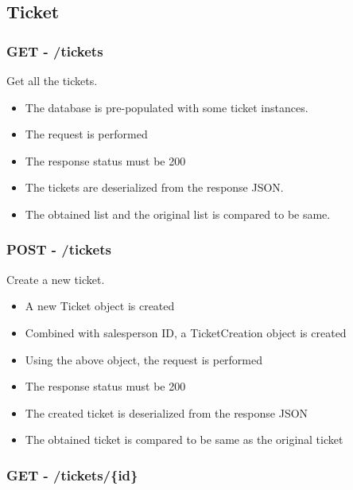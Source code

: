 \documentclass[]{article}
\providecommand{\tightlist}{%
  \setlength{\itemsep}{0pt}\setlength{\parskip}{0pt}}
\begin{document}
\hypertarget{ticket}{%
\subsection{Ticket}\label{ticket}}

\hypertarget{get---tickets}{%
\subsubsection{GET - /tickets}\label{get---tickets}}

Get all the tickets.

\begin{itemize}
\tightlist
\item
  The database is pre-populated with some ticket instances.
\item
  The request is performed
\item
  The response status must be 200
\item
  The tickets are deserialized from the response JSON.
\item
  The obtained list and the original list is compared to be same.
\end{itemize}

\hypertarget{post---tickets}{%
\subsubsection{POST - /tickets}\label{post---tickets}}

Create a new ticket.

\begin{itemize}
\tightlist
\item
  A new Ticket object is created
\item
  Combined with salesperson ID, a TicketCreation object is created
\item
  Using the above object, the request is performed
\item
  The response status must be 200
\item
  The created ticket is deserialized from the response JSON
\item
  The obtained ticket is compared to be same as the original ticket
\end{itemize}

\hypertarget{get---ticketsid}{%
\subsubsection{GET - /tickets/\{id\}}\label{get---ticketsid}}
\end{document}
